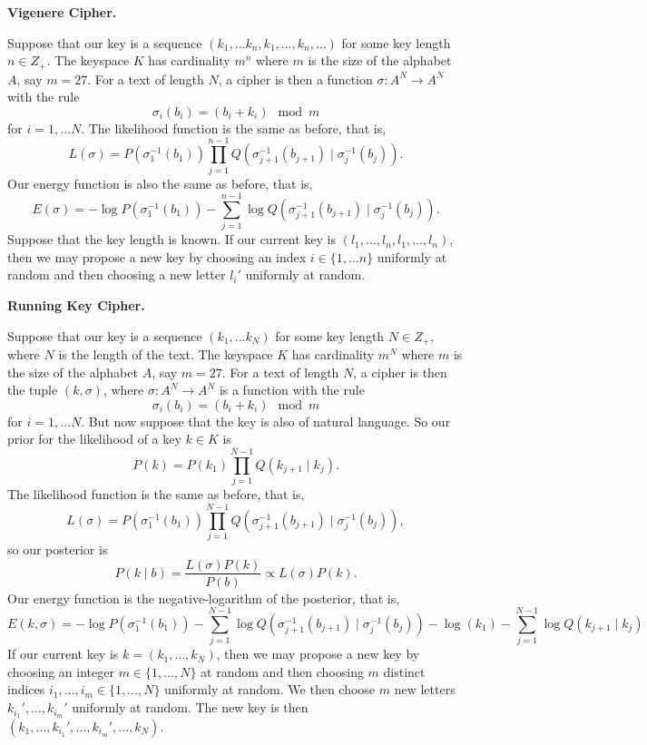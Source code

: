 \documentclass{article}
\begin{document}
\textbf{Vigenere Cipher.} 

Suppose that our key is a sequence $(k_{1}, \ldots k_{n}, k_{1}, \ldots, k_{n}, \ldots)$ for some key length $n \in Z_{+}$. The keyspace $K$ has cardinality $m^{n}$ where $m$ is the size of the alphabet $A$, say $m = 27$. For a text of length $N$, a cipher is then a function $\sigma: A^{N} \to A^{N}$ with the rule 
$$\sigma_{i}(b_{i}) = (b_{i} + k_{i}) \mod m$$
for $i = 1, \ldots N$. The likelihood function is the same as before, that is, 
$$L(\sigma) = P(\sigma_{1}^{-1}(b_{1}))\prod_{j=1}^{n-1}Q(\sigma_{j+1}^{-1}(b_{j+1}) \mid \sigma_{j}^{-1}(b_{j})).$$
Our energy function is also the same as before, that is, 
$$E(\sigma) = -\log P(\sigma_{1}^{-1}(b_{1})) - \sum_{j=1}^{n-1} \log Q(\sigma_{j+1}^{-1}(b_{j+1}) \mid \sigma_{j}^{-1}(b_{j})).$$
Suppose that the key length is known. If our current key is $(l_{1}, \ldots, l_{n}, l_{1}, \ldots, l_{n})$, then we may propose a new key by choosing an index $i \in \{1, \ldots n\}$ uniformly at random and then choosing a new letter $l_{i}'$ uniformly at random.

\textbf{Running Key Cipher.}

Suppose that our key is a sequence $(k_{1}, \ldots k_{N})$ for some key length $N \in Z_{+}$, where $N$ is the length of the text. The keyspace $K$ has cardinality $m^{N}$ where $m$ is the size of the alphabet $A$, say $m = 27$. For a text of length $N$, a cipher is then the tuple $(k, \sigma)$, where $\sigma: A^{N} \to A^{N}$ is a function with the rule 
$$\sigma_{i}(b_{i}) = (b_{i} + k_{i}) \mod m$$
for $i = 1, \ldots N$. But now suppose that the key is also of natural language. So our prior for the likelihood of a key $k \in K$ is 
$$P(k) = P(k_{1}) \prod_{j=1}^{N-1} Q(k_{j+1} \mid k_{j}).$$
The likelihood function is the same as before, that is,
$$L(\sigma) = P(\sigma_{1}^{-1}(b_{1}))\prod_{j=1}^{N-1}Q(\sigma_{j+1}^{-1}(b_{j+1}) \mid \sigma_{j}^{-1}(b_{j})),$$
so our posterior is 
$$P(k \mid b) = \frac{L(\sigma) P(k)}{P(b)} \propto L(\sigma) P(k).$$
Our energy function is the negative-logarithm of the posterior, that is, 
$$E(k, \sigma) = -\log P(\sigma_{1}^{-1}(b_{1})) - \sum_{j=1}^{N-1} \log Q(\sigma_{j+1}^{-1}(b_{j+1}) \mid \sigma_{j}^{-1}(b_{j})) - \log(k_{1}) - \sum_{j=1}^{N-1}\log Q(k_{j+1} \mid k_{j})$$
If our current key is $k = (k_{1}, \ldots, k_{N})$, then we may propose a new key by choosing an integer $m \in \{1, \ldots, N\}$ at random and then choosing $m$ distinct indices $i_{1}, \ldots, i_{m} \in \{1, \ldots, N\}$ uniformly at random. We then choose $m$ new letters $k_{i_{1}}', \ldots, k_{i_{m}}'$ uniformly at random. The new key is then $(k_{1}, \ldots, k_{i_{1}}', \ldots, k_{i_{m}}', \ldots, k_{N})$.
\end{document}
